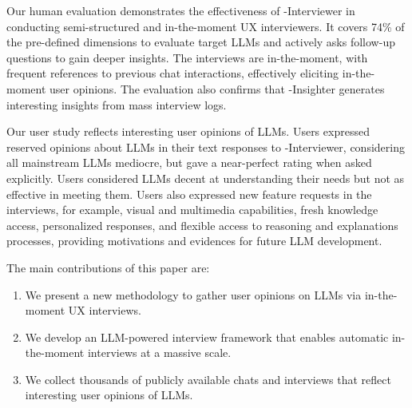 Our human evaluation demonstrates the effectiveness of \method-Interviewer in conducting semi-structured and in-the-moment UX interviewers.
It covers 74\% of the pre-defined dimensions to evaluate target LLMs and actively asks follow-up questions to gain deeper insights.
The interviews are in-the-moment, with frequent references to previous chat interactions, effectively eliciting in-the-moment user opinions.
The evaluation also confirms that \method-Insighter  generates interesting insights from mass interview logs.

Our user study reflects interesting user opinions of LLMs. Users expressed reserved opinions about LLMs in their text responses to \method-Interviewer, considering all mainstream LLMs mediocre, but gave a near-perfect rating when asked explicitly. Users considered LLMs decent at understanding their needs but not as effective in meeting them. Users also expressed new feature requests in the interviews, for example, visual and multimedia capabilities, fresh knowledge access, personalized responses, and flexible access to reasoning and explanations processes, providing motivations and evidences for future LLM development.

The main contributions of this paper are:
\begin{enumerate}
    \item We present a new methodology to gather user opinions on LLMs via in-the-moment UX interviews.
    \item We develop an LLM-powered interview framework that enables automatic in-the-moment interviews at a massive scale.
    \item We collect thousands of publicly available chats and interviews that reflect interesting user opinions of LLMs.
\end{enumerate}